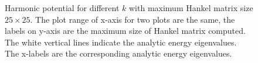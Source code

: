 \documentclass[10pt]{article}
\begin{document}
\begin{figure}[!htb]
\centering
{}\qquad
{}
\caption{Harmonic potential for different $k$ with maximum Hankel matrix size $25\times 25$. The plot range of x-axis for two plots are the same, the labels on y-axis are the maximum size of Hankel matrix computed. The white vertical lines indicate the analytic energy eigenvalues. The x-labels are the corresponding analytic energy eigenvalues.}
\end{figure}
\end{document}
